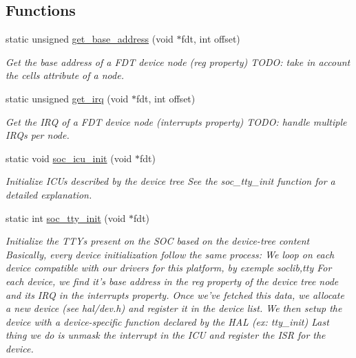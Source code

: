 \subsection*{Functions}
\begin{DoxyCompactItemize}
\item 
static unsigned \hyperlink{qemu-virt-riscv_2soc_8c_a8f32c2785fa3edd070abdaa34c96f6a7}{get\-\_\-base\-\_\-address} (void $\ast$fdt, int offset)
\begin{DoxyCompactList}\small\item\em Get the base address of a F\-D\-T device node (reg property) T\-O\-D\-O\-: take in account the cells attribute of a node. \end{DoxyCompactList}\item 
static unsigned \hyperlink{qemu-virt-riscv_2soc_8c_a7bd21ef4af7971db5dad06231290d8d1}{get\-\_\-irq} (void $\ast$fdt, int offset)
\begin{DoxyCompactList}\small\item\em Get the I\-R\-Q of a F\-D\-T device node (interrupts property) T\-O\-D\-O\-: handle multiple I\-R\-Qs per node. \end{DoxyCompactList}\item 
static void \hyperlink{qemu-virt-riscv_2soc_8c_a4c268c213e6a62adfab96031629fa015}{soc\-\_\-icu\-\_\-init} (void $\ast$fdt)
\begin{DoxyCompactList}\small\item\em Initialize I\-C\-Us described by the device tree See the soc\-\_\-tty\-\_\-init function for a detailed explanation. \end{DoxyCompactList}\item 
static int \hyperlink{qemu-virt-riscv_2soc_8c_a05f9476d07e118d280add6f5e3de365b}{soc\-\_\-tty\-\_\-init} (void $\ast$fdt)
\begin{DoxyCompactList}\small\item\em Initialize the T\-T\-Ys present on the S\-O\-C based on the device-\/tree content Basically, every device initialization follow the same process\-: We loop on each device compatible with our drivers for this platform, by exemple soclib,tty For each device, we find it's base address in the reg property of the device tree node and its I\-R\-Q in the interrupts property. Once we've fetched this data, we allocate a new device (see hal/dev.\-h) and register it in the device list. We then setup the device with a device-\/specific function declared by the H\-A\-L (ex\-: tty\-\_\-init) Last thing we do is unmask the interrupt in the I\-C\-U and register the I\-S\-R for the device. \end{DoxyCompactList}\item 

\end{DoxyCompactItemize}
